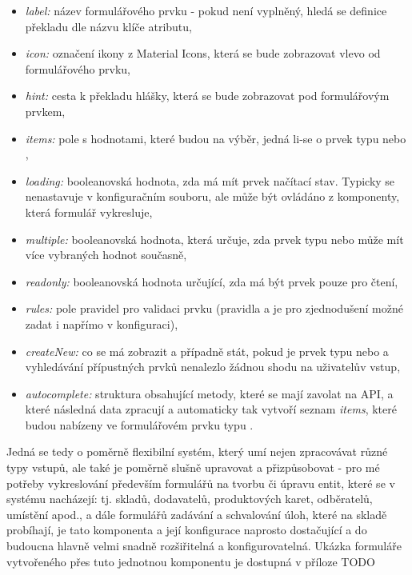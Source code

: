 \begin{itemize}
    \item \emph{label:} název formulářového prvku - pokud není vyplněný, hledá se definice překladu dle názvu klíče atributu,
    \item \emph{icon:} označení ikony z Material Icons, která se bude zobrazovat vlevo od formulářového prvku,
    \item \emph{hint:} cesta k překladu hlášky, která se bude zobrazovat pod formulářovým prvkem,
    \item \emph{items:} pole s hodnotami, které budou na výběr, jedná li-se o prvek typu  nebo ,
    \item \emph{loading:} booleanovská hodnota, zda má mít prvek načítací stav. Typicky se nenastavuje v konfiguračním souboru, ale může být ovládáno z komponenty, která formulář vykresluje,
    \item \emph{multiple:} booleanovská hodnota, která určuje, zda prvek typu  nebo  může mít více vybraných hodnot současně,
    \item \emph{readonly:} booleanovská hodnota určující, zda má být prvek pouze pro čtení,
    \item \emph{rules:} pole pravidel pro validaci prvku (pravidla  a  je pro zjednodušení možné zadat i napřímo v konfiguraci),
    \item \emph{createNew:} co se má zobrazit a případně stát, pokud je prvek typu  nebo  a vyhledávání přípustných prvků nenalezlo žádnou shodu na uživatelův vstup,
    \item \emph{autocomplete:} struktura obsahující metody, které se mají zavolat na API, a které následná data zpracují a automaticky tak vytvoří seznam \emph{items}, které budou nabízeny ve formulářovém prvku typu .
\end{itemize}

Jedná se tedy o poměrně flexibilní systém, který umí nejen zpracovávat různé typy vstupů, ale také je poměrně slušně upravovat a přizpůsobovat - pro mé potřeby vykreslování především formulářů na tvorbu či úpravu entit, které se v systému nacházejí: tj. skladů, dodavatelů, produktových karet, odběratelů, umístění apod., a dále formulářů zadávání a schvalování úloh, které na skladě probíhají, je tato komponenta a její konfigurace naprosto dostačující a do budoucna hlavně velmi snadně rozšiřitelná a konfigurovatelná. Ukázka formuláře vytvořeného přes tuto jednotnou komponentu je dostupná v příloze TODO

